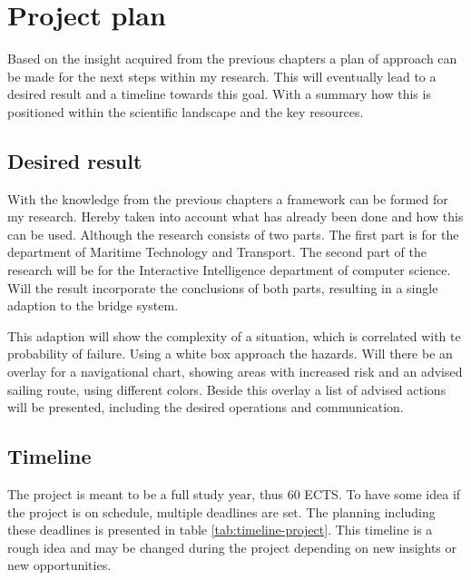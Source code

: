 \chapter{Project plan}
Based on the insight acquired from the previous chapters a plan of approach can be made for the next steps within my research. This will eventually lead to a desired result and a timeline towards this goal. With a summary how this is positioned within the scientific landscape and the key resources.

\section{Desired result}
With the knowledge from the previous chapters a framework can be formed for my research. Hereby taken into account what has already been done and how this can be used.
Although the research consists of two parts. The first part is for the department of Maritime Technology and Transport. The second part of the research will be for the Interactive Intelligence department of computer science. Will the result incorporate the conclusions of both parts, resulting in a single adaption to the bridge system.

This adaption will show the complexity of a situation, which is correlated with te probability of failure. Using a white box approach the hazards. Will there be an overlay for a navigational chart, showing areas with increased risk and an advised sailing route, using different colors. Beside this overlay a list of advised actions will be presented, including the desired operations and communication.

\section{Timeline}
The project is meant to be a full study year, thus 60 ECTS. To have some idea if the project is on schedule, multiple deadlines are set. The planning including these deadlines is presented in table \ref{tab:timeline-project}. This timeline is a rough idea and may be changed during the project depending on new insights or new opportunities.

